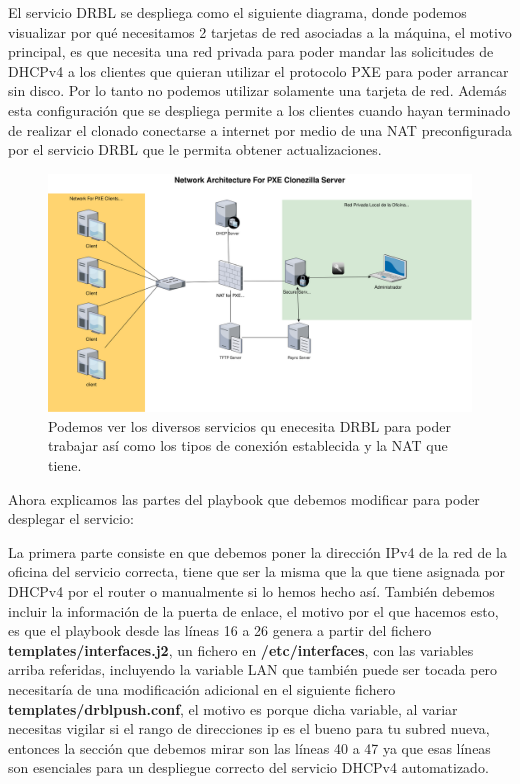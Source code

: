 El servicio DRBL se despliega como el siguiente diagrama, donde podemos visualizar por qué necesitamos 2 tarjetas de red asociadas a la máquina, el motivo principal, es que necesita
una red privada para poder mandar las solicitudes de DHCPv4 a los clientes que quieran utilizar el protocolo PXE para poder arrancar sin disco. Por lo tanto no podemos utilizar 
solamente una tarjeta de red. Además esta configuración que se despliega permite a los clientes cuando hayan terminado de realizar el clonado conectarse a internet por medio de una
NAT preconfigurada por el servicio DRBL que le permita obtener actualizaciones.

\begin{figure}[H]
	\centering
	\includegraphics[scale=0.30]{drbl/network_diagram}
	\caption{Podemos ver los diversos servicios qu enecesita DRBL para poder trabajar así como los tipos de conexión establecida y la NAT que tiene.}
\end{figure}

Ahora explicamos las partes del playbook que debemos modificar para poder desplegar el servicio:

La primera parte consiste en que debemos poner la dirección IPv4 de la red de la oficina del servicio correcta, tiene que ser la misma que la que tiene asignada por DHCPv4 por el router o manualmente
si lo hemos hecho así. También debemos incluir la información de la puerta de enlace, el motivo por el que hacemos esto, es que el playbook desde las líneas 16 a 26 genera a partir
del fichero \textbf{templates/interfaces.j2}, un fichero en \textbf{/etc/interfaces}, con las variables arriba referidas, incluyendo la variable LAN que también puede ser tocada pero
necesitaría de una modificación adicional en el siguiente fichero \textbf{templates/drblpush.conf}, el motivo es porque dicha variable, al variar necesitas vigilar si el rango de direcciones
ip es el bueno para tu subred nueva, entonces la sección que debemos mirar son las líneas 40 a 47 ya que esas líneas son esenciales para un despliegue correcto del servicio DHCPv4 automatizado.


